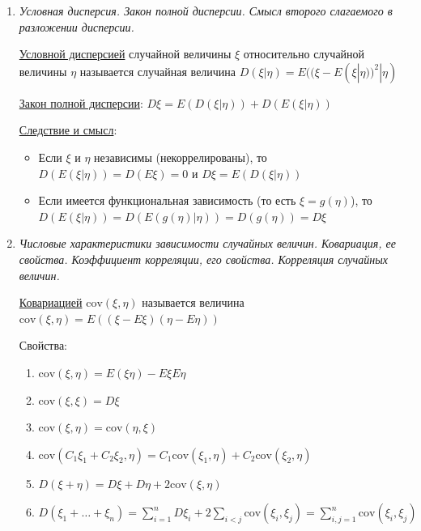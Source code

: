 \documentclass[12pt]{article}
\begin{document}
\begin{enumerate}
    \item \textit{Условная дисперсия. Закон полной дисперсии. Смысл второго слагаемого в разложении дисперсии.}

    \hyperlink{conditionalvariance}{Условной дисперсией} случайной величины $\xi$ относительно случайной величины $\eta$ называется случайная величина 
    $D(\xi | \eta) = E((\xi - E(\xi | \eta))^2 | \eta)$
    
    \hyperlink{lawoffullvariance}{Закон полной дисперсии}: \Ths $D\xi = E(D(\xi | \eta)) + D(E(\xi | \eta))$

    \underline{Следствие и смысл}: 
    
    \begin{itemize}
        \item Если $\xi$ и $\eta$ независимы (некоррелированы), то $D(E(\xi | \eta)) = D(E\xi) = 0$ и $D\xi = E(D(\xi | \eta))$

        \item Если имеется функциональная зависимость (то есть $\xi = g(\eta)$), то $D(E(\xi | \eta)) = D(E(g(\eta) | \eta)) = 
        D(g(\eta)) = D\xi$
    \end{itemize}

    \item \textit{Числовые характеристики зависимости случайных величин. Ковариация, ее свойства. Коэффициент корреляции, его свойства. Корреляция случайных величин.}

    \hyperlink{covariance}{Ковариацией} $\mathrm{cov}(\xi, \eta)$ называется величина $\mathrm{cov}(\xi, \eta) = E((\xi - E\xi)(\eta - E\eta))$

    Свойства:

    \begin{enumerate}
        \item $\mathrm{cov} (\xi, \eta) = E(\xi\eta) - E\xi E\eta$

        \item $\mathrm{cov} (\xi, \xi) = D\xi$

        \item $\mathrm{cov}(\xi, \eta) = \mathrm{cov}(\eta, \xi)$

        \item $\mathrm{cov}(C_1 \xi_1 + C_2 \xi_2, \eta) = C_1 \mathrm{cov}(\xi_1, \eta) + C_2 \mathrm{cov}(\xi_2, \eta)$

        \item $D(\xi + \eta) = D\xi + D\eta + 2\mathrm{cov}(\xi, \eta)$

        \item $D(\xi_1 + \dots + \xi_n) = \sum_{i = 1}^n D\xi_i + 2\sum_{i < j} \mathrm{cov}(\xi_i, \xi_j) = \sum_{i, j = 1}^{n} \mathrm{cov}(\xi_i, \xi_j)$


\end{enumerate}
\end{enumerate}
\end{document}
